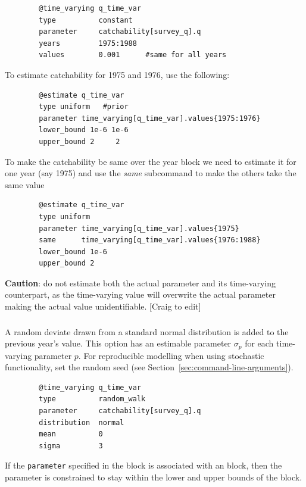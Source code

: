 {\small{\begin{verbatim}
		@time_varying q_time_var
		type          constant
		parameter     catchability[survey_q].q
		years         1975:1988
		values        0.001      #same for all years
		\end{verbatim}}}

To estimate catchability for 1975 and 1976, use the following:

{\small{\begin{verbatim}
		@estimate q_time_var
		type uniform   #prior
		parameter time_varying[q_time_var].values{1975:1976}
		lower_bound 1e-6 1e-6
		upper_bound 2     2
		\end{verbatim}}}

To make the catchability be same over the year block we need to estimate it for one year (say 1975) and use the \textit{same} subcommand to make the others take the same value

{\small{\begin{verbatim}
		@estimate q_time_var
		type uniform
		parameter time_varying[q_time_var].values{1975}
		same      time_varying[q_time_var].values{1976:1988}
		lower_bound 1e-6
		upper_bound 2
		\end{verbatim}}}
		
\textbf{Caution}: do not estimate both the actual parameter and its time-varying counterpart, as the time-varying value will overwrite the actual parameter making the actual value unidentifiable. [Craig to edit]

\subsubsection[Random Walk]{}

A random deviate drawn from a standard normal distribution is added to the previous year's value. This option has an estimable parameter $\sigma_p$ for each time-varying parameter $p$. For reproducible modelling when using stochastic functionality, set the random seed (see Section~\ref{sec:command-line-arguments}).

{\small{\begin{verbatim}
		@time_varying q_time_var
		type          random_walk
		parameter     catchability[survey_q].q
		distribution  normal
		mean          0
		sigma         3
		\end{verbatim}}}

If the \texttt{parameter} specified in the  block is associated with an  block, then the parameter is constrained to stay within the lower and upper bounds of the  block.

